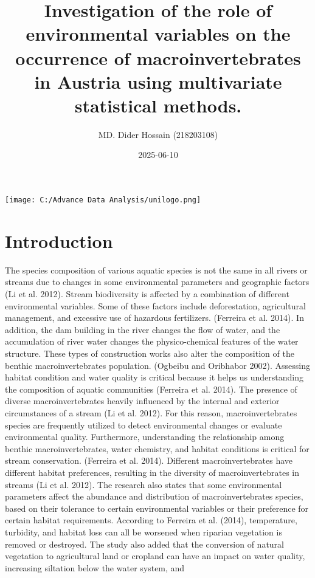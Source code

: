 \documentclass[
]{article}
\title{Investigation of the role of environmental variables on the
occurrence of macroinvertebrates in Austria using multivariate
statistical methods.}
\author{MD. Dider Hossain (218203108)}
\date{2025-06-10}
\begin{document}
\maketitle

\texttt{[image: C:/Advance Data Analysis/unilogo.png]}

\hypertarget{introduction}{%
\section{Introduction}\label{introduction}}

The species composition of various aquatic species is not the same in
all rivers or streams due to changes in some environmental parameters
and geographic factors (Li et al. 2012). Stream biodiversity is affected
by a combination of different environmental variables. Some of these
factors include deforestation, agricultural management, and excessive
use of hazardous fertilizers. (Ferreira et al. 2014). In addition, the
dam building in the river changes the flow of water, and the
accumulation of river water changes the physico-chemical features of the
water structure. These types of construction works also alter the
composition of the benthic macroinvertebrates population. (Ogbeibu and
Oribhabor 2002). Assessing habitat condition and water quality is
critical because it helps us understanding the composition of aquatic
communities (Ferreira et al. 2014). The presence of diverse
macroinvertebrates heavily influenced by the internal and exterior
circumstances of a stream (Li et al. 2012). For this reason,
macroinvertebrates species are frequently utilized to detect
environmental changes or evaluate environmental quality. Furthermore,
understanding the relationship among benthic macroinvertebrates, water
chemistry, and habitat conditions is critical for stream conservation.
(Ferreira et al. 2014). Different macroinvertebrates have different
habitat preferences, resulting in the diversity of macroinvertebrates in
streams (Li et al. 2012). The research also states that some
environmental parameters affect the abundance and distribution of
macroinvertebrates species, based on their tolerance to certain
environmental variables or their preference for certain habitat
requirements. According to Ferreira et al. (2014), temperature,
turbidity, and habitat loss can all be worsened when riparian vegetation
is removed or destroyed. The study also added that the conversion of
natural vegetation to agricultural land or cropland can have an impact
on water quality, increasing siltation below the water system, and
\end{document}
